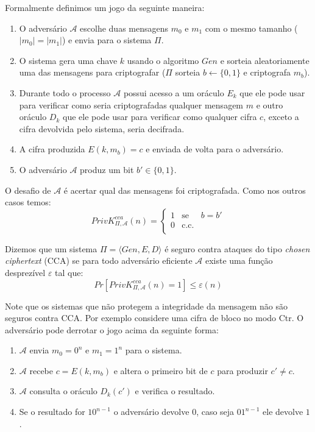 Formalmente definimos um jogo da seguinte maneira:
\begin{enumerate}
\item O adversário $\mathcal{A}$ escolhe duas mensagens $m_0$ e $m_1$ com o mesmo tamanho ($|m_0| = |m_1|$) e envia para o sistema $\Pi$.
\item O sistema gera uma chave $k$ usando o algoritmo $Gen$ e sorteia aleatoriamente uma das mensagens para criptografar ($\Pi$ sorteia $b \leftarrow \{0, 1\}$ e criptografa $m_b$).
\item Durante todo o processo $\mathcal{A}$ possui acesso a um oráculo $E_k$ que ele pode usar para verificar como seria criptografadas qualquer mensagem $m$ e outro oráculo $D_k$ que ele pode usar para verificar como qualquer cifra $c$, exceto a cifra devolvida pelo sistema, seria decifrada.
\item A cifra produzida $E(k, m_b) = c$ e enviada de volta para o adversário.
\item O adversário $\mathcal{A}$ produz um bit $b' \in \{0,1\}$.
\end{enumerate}

O desafio de $\mathcal{A}$ é acertar qual das mensagens foi criptografada.
Como nos outros casos temos:
\begin{displaymath}
  PrivK^{cca}_{\Pi, \mathcal{A}}(n) = \left\{
    \begin{array}{lcl}
      1 & \textrm{se} & b = b'\\
      0 & \textrm{c.c.} &\\
    \end{array}
    \right.
\end{displaymath}

Dizemos que um sistema $\Pi = \langle Gen, E, D \rangle$ é seguro contra ataques do tipo {\em chosen ciphertext} (CCA) se para todo adversário eficiente $\mathcal{A}$ existe uma função desprezível $\varepsilon$ tal que:
\begin{displaymath}
  Pr[PrivK^{cca}_{\Pi, \mathcal{A}}(n) = 1] \leq \varepsilon(n)
\end{displaymath}

Note que os sistemas que não protegem a integridade da mensagem não são seguros contra CCA.
Por exemplo considere uma cifra de bloco no modo Ctr.
O adversário pode derrotar o jogo acima da seguinte forma:
\begin{enumerate}
\item $\mathcal{A}$ envia $m_0 = 0^n$ e $m_1 = 1^n$ para o sistema.
\item $\mathcal{A}$ recebe $c = E(k, m_b)$ e altera o primeiro bit de $c$ para produzir $c' \neq c$.
\item $\mathcal{A}$ consulta o oráculo $D_k(c')$ e verifica o resultado.
\item Se o resultado for $10^{n-1}$ o adversário devolve $0$, caso seja $01^{n-1}$ ele devolve $1$.
\end{enumerate}

